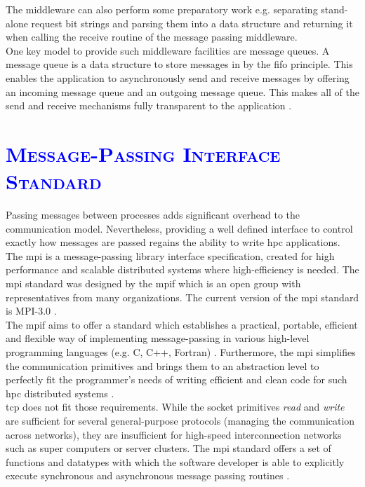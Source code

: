 \documentclass[xcolor=dvipsnames]{article}
\begin{document}
\noindent The middleware can also perform some preparatory work e.g. separating stand-alone request bit strings and parsing them into a data structure and returning it when calling the receive routine of the message passing middleware.\\

\noindent One key model to provide such middleware facilities are message queues. A message queue is a data structure to store messages in by the \gls{fifo} principle. This enables the application to asynchronously send and receive messages by offering an incoming message queue and an outgoing message queue. This makes all of the send and receive mechanisms fully transparent to the application \cite[ch. 4.3.2 on p. 145 - 147]{tanenbaum}.

\section{\scshape{\textcolor{blue}{Message-Passing Interface Standard}}} \label{message_passing_interface}

Passing messages between processes adds significant overhead to the communication model. Nevertheless, providing a well defined interface to control exactly how messages are passed regains the ability to write \gls{hpc} applications.\\

\noindent The \gls{mpi} is a message-passing library interface specification, created for high performance and scalable distributed systems where high-efficiency is needed.  The \gls{mpi} standard was designed by the \sloppy \gls{mpif} which is an open group with representatives from many organizations. The current version of the \gls{mpi} standard is MPI-3.0 \cite[ch. Abstract/ii \& ch. Acknowledgements/xx \& ch. 1.1 on p. 1 \& ch. 1.2 on p. 2]{mpi}.\\

\noindent The \gls{mpif} aims to offer a standard which establishes a practical, portable, efficient and flexible way of implementing message-passing in various high-level programming languages (e.g. C, C++, Fortran) \cite[ch. History/iii]{mpi}. Furthermore, the \gls{mpi} simplifies the communication primitives and brings them to an abstraction level to perfectly fit the programmer's needs of writing efficient and clean code for such \gls{hpc} distributed systems \cite[ch. 4.3.1 on p 143]{tanenbaum}.\\

\noindent \gls{tcp} does not fit those requirements. While the socket primitives \textit{read} and \textit{write} are sufficient for several general-purpose protocols (managing the communication across networks), they are insufficient for high-speed interconnection networks such as super computers or server clusters. The \gls{mpi} standard offers a set of functions and datatypes with which the software developer is able to explicitly execute synchronous and asynchronous message passing routines \cite[ch. 4.3 on p. 143]{tanenbaum}.\\
\end{document}
